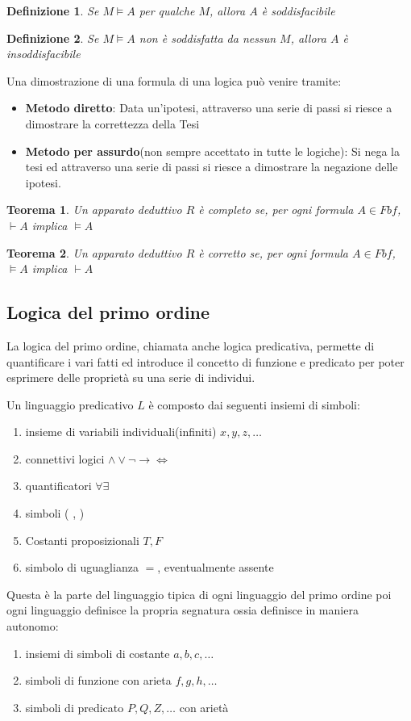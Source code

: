 \documentclass[a4paper]{report}
\newtheorem{defi}{Definizione}%
\newtheorem{teorema}{Teorema}[chapter]
\begin{document}
\begin{defi}
    Se $M \models A$ per qualche $M$, allora $A$ è soddisfacibile
\end{defi}

\begin{defi}
Se $M \models A$ non è soddisfatta da nessun $M$, allora $A$ è insoddisfacibile
\end{defi}

Una dimostrazione di una formula di una logica può venire tramite:
\begin{itemize}
  \item  \textbf{Metodo diretto}: Data un'ipotesi, attraverso una serie di passi
          si riesce a dimostrare la correttezza della Tesi
  \item \textbf{Metodo per assurdo}(non sempre accettato in tutte le logiche):
        Si nega la tesi ed attraverso una serie di passi si riesce a dimostrare
        la negazione delle ipotesi.
\end{itemize}

\begin{teorema}
    Un apparato deduttivo $R$ è completo se, per ogni formula $A \in Fbf$, $\vdash A$
    implica $\models A$
\end{teorema}

\begin{teorema}
    Un apparato deduttivo $R$ è corretto se, per ogni formula $A \in Fbf$, $\models A$
    implica $\vdash A$
\end{teorema}

\subsection{Logica del primo ordine}
La logica del primo ordine, chiamata anche logica predicativa, permette di quantificare i vari fatti ed introduce il concetto di funzione e
predicato per poter esprimere delle proprietà su una serie di individui.

Un linguaggio predicativo $L$ è composto dai seguenti insiemi di simboli:
\begin{enumerate}
    \item insieme di variabili individuali(infiniti) $x,y,z,\dots$
    \item connettivi logici $\land \lor \neg \rightarrow \iff$
    \item quantificatori  $\forall \exists$
    \item simboli ( , )
    \item Costanti proposizionali $T,F$
    \item simbolo di uguaglianza $=$, eventualmente assente
\end{enumerate}
Questa è la parte del linguaggio tipica di ogni linguaggio del primo ordine poi
ogni linguaggio definisce la propria segnatura ossia definisce in maniera autonomo:
\begin{enumerate}
    \item insiemi di simboli di costante $a,b,c,\dots$
    \item simboli di funzione con arieta $f,g,h,\dots$
    \item simboli di predicato $P,Q,Z,\dots$ con arietà
\end{enumerate}
\end{document}
